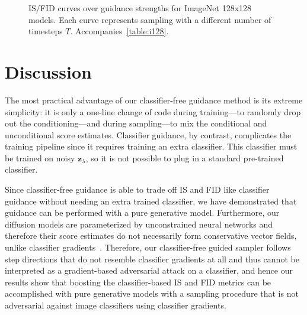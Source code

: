 \documentclass{article} %
\newcommand{\bz}{\mathbf{z}}
\begin{document}
\loadedtable
\begin{figure}[!htb] \centering
{}
\caption{IS/FID curves over guidance strengths for ImageNet 128x128 models. Each curve represents sampling with a different number of timesteps $T$. Accompanies~\cref{table:i128}.}
\label{fig:i128_fid_is_plot}
\end{figure}




\section{Discussion}
\label{sec:discussion}

The most practical advantage of our classifier-free guidance method is its extreme simplicity: it is only a one-line change of code during training---to randomly drop out the conditioning---and during sampling---to mix the conditional and unconditional score estimates. Classifier guidance, by contrast, complicates the training pipeline since it requires training an extra classifier. This classifier must be trained on noisy $\bz_\lambda$, so it is not possible to plug in a standard pre-trained classifier.

Since classifier-free guidance is able to trade off IS and FID like classifier guidance without needing an extra trained classifier, we have demonstrated that guidance can be performed with a pure generative model. 
Furthermore, our diffusion models are parameterized by unconstrained neural networks and therefore their score estimates do not necessarily form conservative vector fields, unlike classifier gradients~\citep{salimans2021should}. Therefore, our  classifier-free guided sampler follows step directions that do not resemble classifier gradients at all and thus cannot be interpreted as a gradient-based adversarial attack on a classifier, and hence our results show that boosting the classifier-based IS and FID metrics can be accomplished with pure generative models with a sampling procedure that is not adversarial against image classifiers using classifier gradients.
\end{document}
